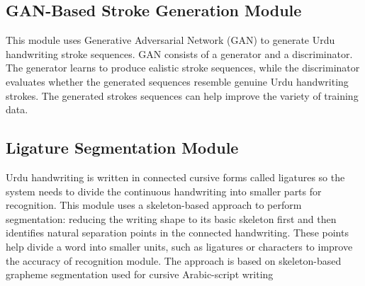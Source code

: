 \documentclass[12pt,a4paper]{report}
\begin{document}
\subsection{GAN-Based Stroke Generation Module}
This module uses Generative Adversarial Network (GAN) to generate Urdu handwriting stroke sequences. GAN consists of a generator and a discriminator. The generator learns to produce ealistic stroke sequences, while the discriminator evaluates whether the generated sequences resemble genuine Urdu handwriting strokes. The generated strokes sequences can help improve the variety of training data.

\subsection{Ligature Segmentation Module}
Urdu handwriting is written in connected cursive forms called ligatures so the system needs to divide the continuous handwriting into smaller parts for recognition. This module uses a skeleton-based approach to perform segmentation: reducing the writing shape to its basic skeleton first and then identifies natural separation points in the connected handwriting. These points help divide a word into smaller units, such as ligatures or characters to improve the accuracy of recognition module. The approach is based on skeleton-based grapheme segmentation used for cursive Arabic-script writing \cite{abandah2010}
\end{document}

